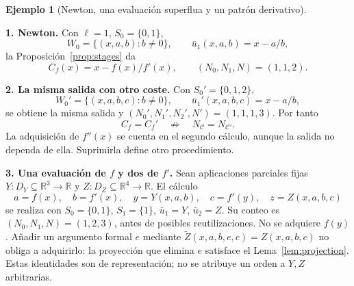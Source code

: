 \documentclass[11pt,a4paper]{article}
\numberwithin{equation}{section}
\theoremstyle{definition}
\newtheorem{example}[theorem]{Ejemplo}
\theoremstyle{remark}
\newcommand{\R}{\mathbb R}
\newcommand{\paso}[1]{\par\smallskip\noindent\textbf{#1}\quad}
\begin{document}
\begin{example}[Newton, una evaluación superflua y un patrón derivativo]\label{ex:operationalcounts}\label{ex:Jarratt}
\paso{1. Newton.}
Con $\ell=1$, $S_0=\{0,1\}$,
\[
W_0=\{(x,a,b):b\ne0\},\qquad\bar u_1(x,a,b)=x-a/b,
\]
la Proposición~\ref{prop:stages} da
\[
C_f(x)=x-f(x)/f'(x),\qquad(N_0,N_1,N)=(1,1,2).
\]
\paso{2. La misma salida con otro coste.}
Con $S_0'=\{0,1,2\}$,
\[
W_0'=\{(x,a,b,c):b\ne0\},\qquad\bar u_1'(x,a,b,c)=x-a/b,
\]
se obtiene la misma salida y $(N_0',N_1',N_2',N')=(1,1,1,3)$. Por tanto
\[
C_f=C_f'\quad\not\Longrightarrow\quad N_{\mathscr C}=N_{\mathscr C'}.
\]
La adquisición de $f''(x)$ se cuenta en el segundo cálculo, aunque la salida no dependa de ella. Suprimirla define otro procedimiento.
\paso{3. Una evaluación de $f$ y dos de $f'$.}
Sean aplicaciones parciales fijas $Y:D_Y\subseteq\R^3\to\R$ y $Z:D_Z\subseteq\R^4\to\R$. El cálculo
\[
a=f(x),\quad b=f'(x),\quad y=Y(x,a,b),\quad c=f'(y),\quad z=Z(x,a,b,c)
\]
se realiza con $S_0=\{0,1\}$, $S_1=\{1\}$, $\bar u_1=Y$, $\bar u_2=Z$. Su conteo es $(N_0,N_1,N)=(1,2,3)$, antes de posibles reutilizaciones. No se adquiere $f(y)$. Añadir un argumento formal $e$ mediante $\widetilde Z(x,a,b,e,c)=Z(x,a,b,c)$ no obliga a adquirirlo: la proyección que elimina $e$ satisface el Lema~\ref{lem:projection}. Estas identidades son de representación; no se atribuye un orden a $Y,Z$ arbitrarias.
\end{example}
\end{document}
